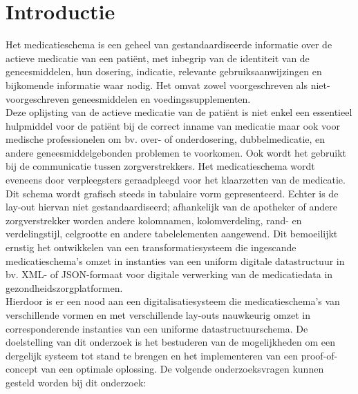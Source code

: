 
\section{Introductie} %
\label{sec:introductie}

Het medicatieschema is een geheel van gestandaardiseerde informatie over de actieve medicatie van een patiënt, met inbegrip van de identiteit van de geneesmiddelen, hun dosering, indicatie, relevante gebruiksaanwijzingen en bijkomende informatie waar nodig. Het omvat zowel voorgeschreven als niet-voorgeschreven geneesmiddelen en voedingssupplementen.\\ 

\noindent Deze oplijsting van de actieve medicatie van de patiënt is niet enkel een essentieel hulpmiddel voor de patiënt bij de correct inname van medicatie maar ook voor medische professionelen om bv. over- of onderdosering, dubbelmedicatie, en andere geneesmiddelgebonden problemen te voorkomen. Ook wordt het gebruikt bij de communicatie tussen zorgverstrekkers. Het medicatieschema wordt eveneens door verpleegsters geraadpleegd voor het klaarzetten van de medicatie.\\

\noindent Dit schema wordt grafisch steeds in tabulaire vorm gepresenteerd. Echter is de lay-out hiervan niet gestandaardiseerd; afhankelijk van de apotheker of andere zorgverstrekker worden andere kolomnamen, kolomverdeling, rand- en verdelingstijl, celgrootte en andere tabelelementen aangewend. Dit bemoeilijkt ernstig het ontwikkelen van een transformatiesysteem die ingescande medicatieschema's omzet in instanties van een uniform digitale datastructuur in bv. XML- of JSON-formaat voor digitale verwerking van de medicatiedata in gezondheidszorgplatformen.\\

\noindent Hierdoor is er een nood aan een digitalisatiesysteem die medicatieschema's van verschillende vormen en met verschillende lay-outs nauwkeurig omzet in corresponderende instanties van een uniforme datastructuurschema. De doelstelling van dit onderzoek is het bestuderen van de mogelijkheden om een dergelijk systeem tot stand te brengen en het implementeren van een proof-of-concept van een optimale oplossing. De volgende onderzoeksvragen kunnen gesteld worden bij dit onderzoek:\\ 

